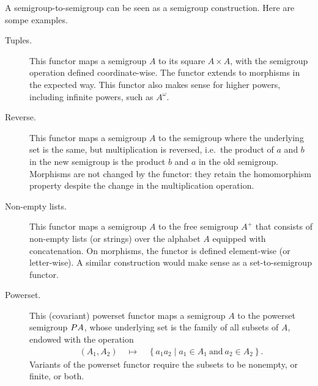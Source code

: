  \begin{example}\label{ex:functors}
 A semigroup-to-semigroup can be seen as a semigroup construction. Here are sompe examples.
 \begin{description}
 \item[Tuples.] This functor maps a semigroup $A$ to its square $A \times A$, with the semigroup operation defined coordinate-wise. The functor extends to morphisms in the expected way. This functor also makes sense for higher powers, including infinite powers, such as $A^\omega$.
 \item[Reverse.] This functor maps a semigroup $A$ to the semigroup where the underlying set is the same, but multiplication is reversed, i.e.~the product of $a$ and $b$ in the new semigroup is the product $b$ and $a$ in the old semigroup. Morphisms are not changed by the functor: they retain the homomorphism property despite the change in the multiplication operation.
 \item[Non-empty lists.] This functor maps a semigroup $A$ to the free semigroup $A^+$ that consists of non-empty lists (or strings) over the alphabet $A$ equipped with concatenation. On morphisms, the functor is defined element-wise (or letter-wise). A similar construction would make sense as a set-to-semigroup functor.
 \item[Powerset.] This (covariant) powerset functor maps a semigroup $A$ to the powerset semigroup $\powerset A$, whose underlying set is the family of all subsets of $A$, endowed with the operation
 \begin{align*}
 (A_1,A_2) \quad \mapsto \quad \left\{a_1 a_2 \mid a_1 \in A_1\ \text{and}\ a_2 \in A_2\right\}.
 \end{align*}
 Variants of the powerset functor require the subsets to be nonempty, or finite, or both.
 \end{description}
 \end{example}

